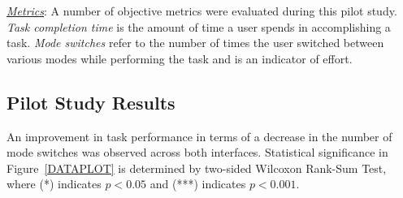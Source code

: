 \documentclass[conference]{IEEEtran}
\begin{document}
\noindent\underline{\textit{Metrics}}: A number of objective metrics were evaluated during this pilot study. \textit{Task completion time} is the amount of time a user spends in accomplishing a task. \textit{Mode switches} refer to the number of times the user switched between various modes while performing the task and is an indicator of effort. 


\subsection{Pilot Study Results}\label{RES}
An improvement in task performance in terms of a decrease in the number of mode switches was observed across both interfaces. Statistical significance in Figure~\ref{DATAPLOT} is determined by two-sided Wilcoxon Rank-Sum Test, where (*) indicates $p < 0.05$ and (***) indicates $p < 0.001$.
\end{document}
